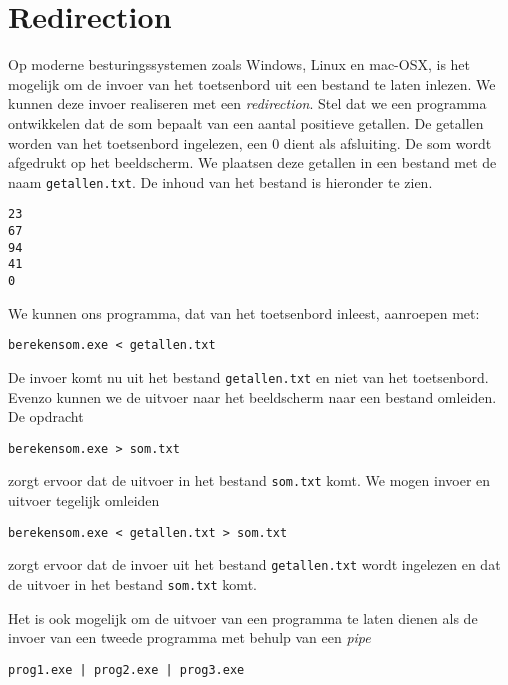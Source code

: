 \section{Redirection}
Op moderne besturingssystemen zoals Windows, Linux en mac-OSX, is het mogelijk om de invoer van het toetsenbord uit een bestand te laten inlezen. We kunnen deze invoer realiseren met een \textsl{redirection}.
Stel dat we een programma ontwikkelen dat de som bepaalt van een aantal positieve getallen. De getallen worden van het toetsenbord ingelezen, een 0 dient als afsluiting. De som wordt afgedrukt op het beeldscherm. We plaatsen deze getallen in een bestand met de naam \lstinline|getallen.txt|. De inhoud van het bestand is hieronder te zien.

\begin{lstlisting}[style=lstoneline]
23
67
94
41
0
\end{lstlisting}

We kunnen ons programma, dat van het toetsenbord inleest, aanroepen met:

\begin{lstlisting}[style=lstoneline]
berekensom.exe < getallen.txt
\end{lstlisting}

De invoer komt nu uit het bestand \lstinline|getallen.txt| en niet van het toetsenbord. Evenzo kunnen we de uitvoer naar het beeldscherm naar een bestand omleiden. De opdracht

\begin{lstlisting}[style=lstoneline]
berekensom.exe > som.txt
\end{lstlisting}

zorgt ervoor dat de uitvoer in het bestand \lstinline|som.txt| komt. We mogen invoer en uitvoer tegelijk omleiden

\begin{lstlisting}[style=lstoneline]
berekensom.exe < getallen.txt > som.txt
\end{lstlisting}

zorgt ervoor dat de invoer uit het bestand \lstinline|getallen.txt| wordt ingelezen en dat de uitvoer in het bestand \lstinline|som.txt| komt.

Het is ook mogelijk om de uitvoer van een programma te laten dienen als de invoer van een tweede programma met behulp van een \textsl{pipe}

\begin{lstlisting}[style=lstoneline]
prog1.exe | prog2.exe | prog3.exe
\end{lstlisting}

